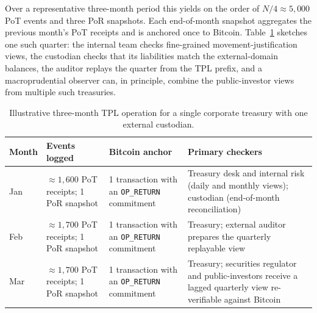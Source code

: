\documentclass[11pt]{article}
\begin{document}
Over a representative three-month period this yields on the order of $N/4 \approx 5{,}000$ PoT events and three PoR snapshots.
Each end-of-month snapshot aggregates the previous month's PoT receipts and is anchored once to Bitcoin.
Table~\ref{tab:tpl-quarter} sketches one such quarter: the internal team checks fine-grained movement-justification views,
the custodian checks that its liabilities match the external-domain balances, the auditor replays the quarter from the TPL
prefix, and a macroprudential observer can, in principle, combine the public-investor views from multiple such treasuries.

\begin{table}[H]
\centering
\small
\begin{tabularx}{\linewidth}{@{}l X X X@{}}
\toprule
Month & Events logged & Bitcoin anchor & Primary checkers \\
\midrule
Jan &
$\approx 1{,}600$ PoT receipts; 1 PoR snapshot &
1 transaction with an \texttt{OP\_RETURN} commitment &
Treasury desk and internal risk (daily and monthly views); custodian (end-of-month reconciliation) \\
Feb &
$\approx 1{,}700$ PoT receipts; 1 PoR snapshot &
1 transaction with an \texttt{OP\_RETURN} commitment &
Treasury; external auditor prepares the quarterly replayable view \\
Mar &
$\approx 1{,}700$ PoT receipts; 1 PoR snapshot &
1 transaction with an \texttt{OP\_RETURN} commitment &
Treasury; securities regulator and public-investors receive a lagged quarterly view re-verifiable against Bitcoin \\
\bottomrule
\end{tabularx}
\caption{Illustrative three-month TPL operation for a single corporate treasury with one external custodian.}
\label{tab:tpl-quarter}
\end{table}
\end{document}
